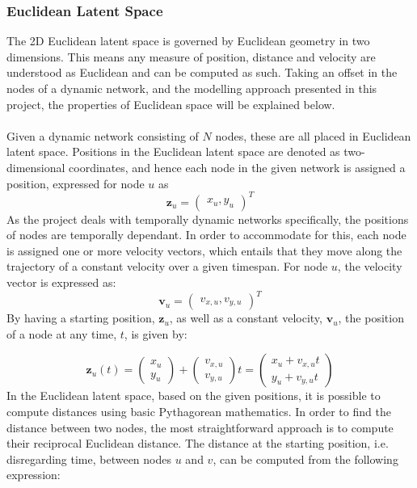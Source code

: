 \subsubsection{Euclidean Latent Space}
\label{sec:Method:LSM:EuclideanLatentSpace}
The 2D Euclidean latent space is governed by Euclidean geometry in two dimensions.
This means any measure of position, distance and velocity are understood as Euclidean and can be computed as such. 
Taking an offset in the nodes of a dynamic network, and the modelling approach presented in this project, the properties of Euclidean space will be explained below.
\\\\
Given a dynamic network consisting of $N$ nodes, these are all placed in Euclidean latent space. 
Positions in the Euclidean latent space are denoted as two-dimensional coordinates, and hence each node in the given network is assigned a position, expressed for node $u$ as
$$\textbf{z}_u = \begin{pmatrix}
x_u, y_u
\end{pmatrix}^T$$
\noindent
As the project deals with temporally dynamic networks specifically, the positions of nodes are temporally dependant. 
In order to accommodate for this, each node is assigned one or more velocity vectors, which entails that they move along the trajectory of a constant velocity over a given timespan.
For node $u$, the velocity vector is expressed as:
$$\textbf{v}_u = \begin{pmatrix}
v_{x,u}, v_{y,u}
\end{pmatrix}^T$$
\noindent
By having a starting position, $\textbf{z}_u$, as well as a constant velocity, $\textbf{v}_u$, the position of a node at any time, $t$, is given by: 

\begin{equation}
    \textbf{z}_u(t) = \begin{pmatrix}
    x_u\\
    y_u
    \end{pmatrix}
    +
    \begin{pmatrix}
    v_{x,u}\\
    v_{y,u}
    \end{pmatrix}
    t
    = 
    \begin{pmatrix}
    x_u + v_{x,u}t\\
    y_u + v_{y,u}t
    \label{eq:latent_pos}
    \end{pmatrix}
\end{equation}
In the Euclidean latent space, based on the given positions, it is possible to compute distances using basic Pythagorean mathematics. 
In order to find the distance between two nodes, the most straightforward approach is to compute their reciprocal Euclidean distance.
The distance at the starting position, i.e. disregarding time, between nodes $u$ and $v$, can be computed from the following expression:

